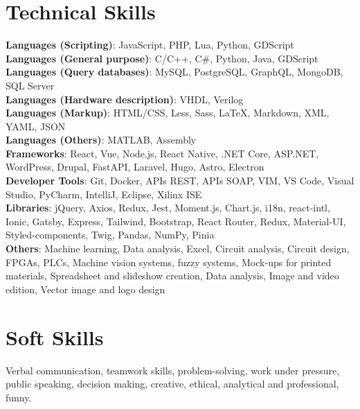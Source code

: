 \documentclass[letterpaper,11pt]{article}
\begin{document}
\section{Technical Skills}
\begin{itemize}[leftmargin=0.05in, label={}, itemsep=2pt, parsep=2pt]
  \small{\item{
    \textbf{Languages (Scripting)}{: JavaScript, PHP, Lua, Python, GDScript} \\
    \textbf{Languages (General purpose)}{: C/C++, C\#, Python, Java, GDScript} \\
    \textbf{Languages (Query databases)}{: MySQL, PostgreSQL, GraphQL, MongoDB, SQL Server} \\
    \textbf{Languages (Hardware description)}{: VHDL, Verilog} \\
    \textbf{Languages (Markup)}{: HTML/CSS, Less, Sass, LaTeX, Markdown, XML, YAML, JSON} \\
    \textbf{Languages (Others)}{: MATLAB, Assembly} \\
    \textbf{Frameworks}{: React, Vue, Node.js, React Native, .NET Core, ASP.NET, WordPress, Drupal, FastAPI, Laravel, Hugo, Astro, Electron} \\
    \textbf{Developer Tools}{: Git, Docker, APIs REST, APIs SOAP, VIM, VS Code, Visual Studio, PyCharm, IntelliJ, Eclipse, Xilinx ISE} \\
    \textbf{Libraries}{: jQuery, Axios, Redux, Jest, Moment.js, Chart.js, i18n, react-intl, Ionic, Gatsby, Express, Tailwind, Bootstrap, React Router, Redux, Material-UI, Styled-components, Twig, Pandas, NumPy, Pinia} \\
    \textbf{Others}{: Machine learning, Data analysis, Excel, Circuit analysis, Circuit design, FPGAs, PLCs, Machine vision systems, fuzzy systems, Mock-ups for printed materials, Spreadsheet and slideshow creation, Data analysis, Image and video edition, Vector image and logo design} \
  }}
\end{itemize}

\section{Soft Skills}
\begin{itemize}[leftmargin=0.05in, label={}]
	\small{
	\item{Verbal communication, teamwork skills, problem-solving, work under pressure, public speaking, decision making, creative, ethical, analytical and professional, funny.}
	}
\end{itemize}

\end{document}
